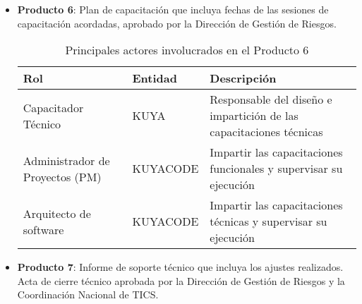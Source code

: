 \begin{itemize}
    \item \textbf{Producto 6}: Plan de capacitación que incluya fechas de las sesiones de capacitación acordadas, aprobado por la Dirección de Gestión de Riesgos.
    
    \begin{table}[h]
        \centering
        \begin{tabular}{|p{3cm}|p{5cm}|p{7cm}|}
            \hline
            \textbf{Rol} & \textbf{Entidad} & \textbf{Descripción} \\
            \hline
            Capacitador Técnico & KUYA & Responsable del diseño e impartición de las capacitaciones técnicas \\
            \hline
            Administrador de Proyectos (PM) & KUYACODE & Impartir las capacitaciones funcionales y supervisar su ejecución \\
            \hline
            Arquitecto de software & KUYACODE & Impartir las capacitaciones técnicas y supervisar su ejecución \\
            \hline
        \end{tabular}
        \caption{Principales actores involucrados en el Producto 6}
        \label{tab:actores_producto6}
    \end{table} 
    \item \textbf{Producto 7}: Informe de soporte técnico que incluya los ajustes realizados. Acta de cierre técnico aprobada por la Dirección de Gestión de Riesgos y la Coordinación Nacional de TICS.


\end{itemize}
